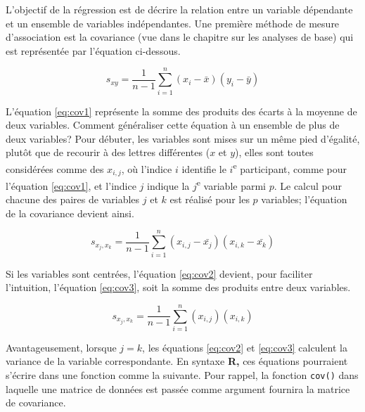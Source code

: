 \documentclass[
]{book}
\begin{document}
L'objectif de la régression est de décrire la relation entre un variable dépendante et un ensemble de variables indépendantes. Une première méthode de mesure d'association est la covariance (vue dans le chapitre sur les analyses de base) qui est représentée par l'équation ci-dessous.

\begin{equation}
s_{xy}=\frac{1}{n-1}\sum_{i=1}^n(x_i-\bar{x})(y_i-\bar{y})
\label{eq:cov1}
\end{equation}

L'équation \eqref{eq:cov1} représente la somme des produits des écarts à la moyenne de deux variables. Comment généraliser cette équation à un ensemble de plus de deux variables? Pour débuter, les variables sont mises sur un même pied d'égalité, plutôt que de recourir à des lettres différentes (\(x\) et \(y\)), elles sont toutes considérées comme des \(x_{i,j}\), où l'indice \(i\) identifie le \(i\)\textsuperscript{e} participant, comme pour l'équation \eqref{eq:cov1}, et l'indice \(j\) indique la \(j\)\textsuperscript{e} variable parmi \(p\). Le calcul pour chacune des paires de variables \(j\) et \(k\) est réalisé pour les \(p\) variables; l'équation de la covariance devient ainsi.

\begin{equation}
s_{x_j,x_k}=\frac{1}{n-1}\sum_{i=1}^n(x_{i,j}-\bar{x_j})(x_{i,k}-\bar{x_k})
\label{eq:cov2}
\end{equation}

Si les variables sont centrées, l'équation \eqref{eq:cov2} devient, pour faciliter l'intuition, l'équation \eqref{eq:cov3}, soit la somme des produits entre deux variables.

\begin{equation}
s_{x_j,x_k}=\frac{1}{n-1}\sum_{i=1}^n(x_{i,j})(x_{i,k})
\label{eq:cov3}
\end{equation}

Avantageusement, lorsque \(j=k\), les équations \eqref{eq:cov2} et \eqref{eq:cov3} calculent la variance de la variable correspondante. En syntaxe \textbf{R,} ces équations pourraient s'écrire dans une fonction comme la suivante. Pour rappel, la fonction \texttt{cov()} dans laquelle une matrice de données est passée comme argument fournira la matrice de covariance.
\end{document}
